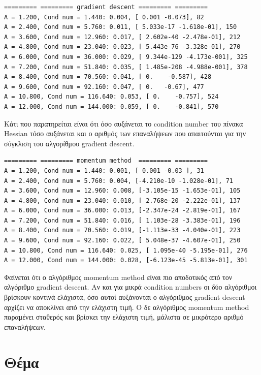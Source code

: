 \documentclass{article}
\newcommand{\eng}[1]{\foreignlanguage{english}{#1}} %
\begin{document}
\begin{verbatim}
========= ========= gradient descent ========= =========
A = 1.200, Cond num = 1.440: 0.004, [ 0.001 -0.073], 82
A = 2.400, Cond num = 5.760: 0.011, [ 5.033e-17 -1.618e-01], 150
A = 3.600, Cond num = 12.960: 0.017, [ 2.602e-40 -2.478e-01], 212
A = 4.800, Cond num = 23.040: 0.023, [ 5.443e-76 -3.328e-01], 270
A = 6.000, Cond num = 36.000: 0.029, [ 9.344e-129 -4.173e-001], 325
A = 7.200, Cond num = 51.840: 0.035, [ 1.485e-208 -4.988e-001], 378
A = 8.400, Cond num = 70.560: 0.041, [ 0.    -0.587], 428
A = 9.600, Cond num = 92.160: 0.047, [ 0.   -0.67], 477
A = 10.800, Cond num = 116.640: 0.053, [ 0.    -0.757], 524
A = 12.000, Cond num = 144.000: 0.059, [ 0.    -0.841], 570
\end{verbatim}

Κάτι που παρατηρείται είναι ότι όσο αυξάνεται το \eng{condition number} του
πίνακα \eng{Hessian} τόσο αυξάνεται και ο αριθμός των επαναλήψεων που
απαιτούνται για την σύγκλιση του αλγορίθμου \eng{gradient descent}.

\begin{verbatim}
========= ========= momentum method  ========= =========
A = 1.200, Cond num = 1.440: 0.001, [ 0.001 -0.03 ], 31
A = 2.400, Cond num = 5.760: 0.004, [-4.210e-10 -1.028e-01], 71
A = 3.600, Cond num = 12.960: 0.008, [-3.105e-15 -1.653e-01], 105
A = 4.800, Cond num = 23.040: 0.010, [ 2.768e-20 -2.222e-01], 137
A = 6.000, Cond num = 36.000: 0.013, [-2.347e-24 -2.819e-01], 167
A = 7.200, Cond num = 51.840: 0.016, [ 1.103e-28 -3.383e-01], 196
A = 8.400, Cond num = 70.560: 0.019, [-1.113e-33 -4.040e-01], 223
A = 9.600, Cond num = 92.160: 0.022, [ 5.048e-37 -4.607e-01], 250
A = 10.800, Cond num = 116.640: 0.025, [ 1.095e-40 -5.195e-01], 276
A = 12.000, Cond num = 144.000: 0.028, [-6.123e-45 -5.813e-01], 301
\end{verbatim}

Φαίνεται ότι ο αλγόριθμος \eng{momentum method} είναι πιο αποδοτικός από τον
αλγόριθμο \eng{gradient descent}. Αν και για μικρά \eng{condition numbers} οι
δύο αλγόριθμοι βρίσκουν κοντινά ελάχιστα, όσο αυτοί αυξάνονται ο αλγόριθμος
\eng{gradient descent} αρχίζει να αποκλίνει από την ελάχιστη τιμή.
Ο δε αλγόριθμος \eng{momentum method} παραμένει σταθερός και βρίσκει την
ελάχιστη τιμή, μάλιστα σε μικρότερο αριθμό επαναλήψεων.

\clearpage
\section{Θέμα}
\end{document}
